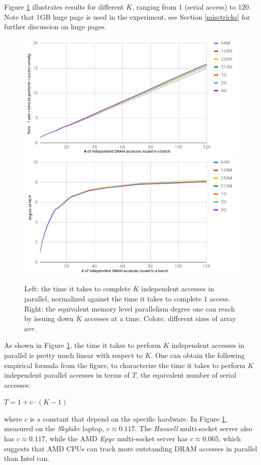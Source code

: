 \documentclass[11pt, usletter]{article}
\begin{document}
Figure \ref{mlprealworld} illustrates results for different $K$, ranging from $1$ (serial access) to $120$. 
Note that 1GB huge page is used in the experiment, see Section \ref{misctricks} for further discussion on huge pages.

\begin{figure}[!htb]
  \includegraphics[width=\linewidth]{equivalentCost.png}
\endminipage\hfill
{}
  \includegraphics[width=\linewidth]{equivalentMLP.png}
\endminipage\hfill
\caption{Left: the time it takes to complete $K$ independent accesses in parallel, 
normalized against the time it takes to complete $1$ access. 
Right: the equivalent memory level parallelism degree one can reach by issuing down $K$ accesses at a time. 
Colors: different sizes of array $arr$.}
\label{mlprealworld}
\end{figure}

As shown in Figure \ref{mlprealworld}, the time it takes to perform $K$ independent accesses in parallel 
is pretty much linear with respect to $K$. 
One can obtain the following empirical formula from the figure, to characterize the 
time it takes to perform $K$ independent parallel accesses in terms of $T$, the equivalent number of serial accesses:
\begin{center}
$T=1+c\cdot (K-1)$
\end{center}
where $c$ is a constant that depend on the specific hardware. 
In Figure \ref{mlprealworld}, measured on the \textit{Skylake} laptop, $c\approx 0.117$. 
The \textit{Haswell} multi-socket server also has $c\approx 0.117$, 
while the AMD \textit{Epyc} multi-socket server has $c\approx 0.065$,
which suggests that AMD CPUs can track more outstanding DRAM accesses in parallel than Intel can. 
\end{document}
